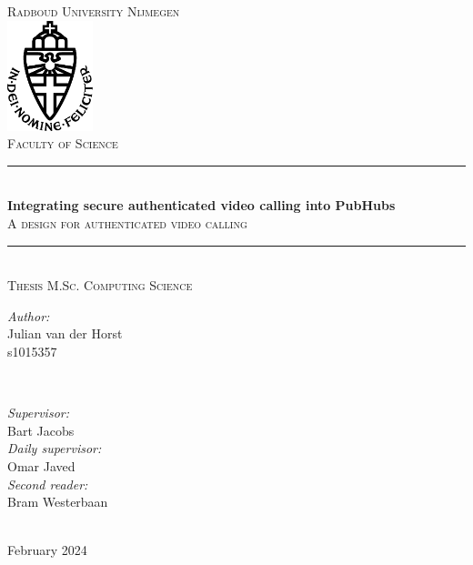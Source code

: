 \documentclass{report}
\title{\thesistitle}
\author{\thesisauthorfirst\space\thesisauthorsecond}
\date{\thesisdate}
\newcommand{\thesistitle}{Integrating secure authenticated video calling into PubHubs}
\newcommand{\thesissubtitle}{A design for authenticated video calling}
\newcommand\thesisauthorfirst{Julian van der Horst \\ s1015357}
\newcommand\thesisauthorsecond{\null}
\newcommand\thesissupervisorfirst{Bart Jacobs}
\newcommand\thesissupervisorsecond{Omar Javed}
\newcommand\thesissecondreadersecond{Bram Westerbaan}
\newcommand\thesisdate{February 2024}
\begin{document}
\begin{titlepage}
\thispagestyle{empty}
\newcommand{\HRule}{\rule{\linewidth}{0.5mm}}
\center
\textsc{\Large Radboud University Nijmegen}\\[.7cm]
\includegraphics[width=25mm]{img/in_dei_nomine_feliciter}\\[.5cm]
\textsc{Faculty of Science}\\[0.5cm]

\HRule \\[0.4cm]
{ \huge \bfseries \thesistitle}\\[0.1cm]
\textsc{\thesissubtitle}\\
\HRule \\[.5cm]
\textsc{\large Thesis M.Sc. Computing Science}\\[.5cm]

\begin{minipage}{0.4\textwidth}
    \begin{flushleft}
        \large
        \emph{Author:}\\
        \thesisauthorfirst\space \textsc{\thesisauthorsecond}
    \end{flushleft}
\end{minipage}
~
\begin{minipage}{0.4\textwidth}
    \begin{flushright}
        \large
        \emph{Supervisor:} \\
        \thesissupervisorfirst  \\[1em]
        \emph{Daily supervisor:} \\
        \thesissupervisorsecond \\[1em]
        \emph{Second reader:} \\
        \thesissecondreadersecond \\[1em]
    \end{flushright}
\end{minipage}\\[4cm]
\vfill
{\large \thesisdate}
\end{titlepage}
\newpage
\end{document}
